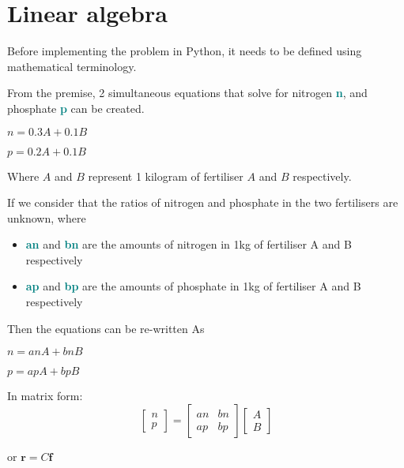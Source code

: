 \documentclass[a4paper]{article}
\begin{document}
\section{Linear algebra}
Before implementing the problem in Python, it needs to be defined using mathematical terminology.
\vspace{2mm}

\noindent
From the premise, 2 simultaneous equations that solve for nitrogen \textbf{\textcolor{teal}{n}}, and phosphate \textbf{\textcolor{teal}{p}} can be created.
\begin{center} $n=0.3A + 0.1B$ \end{center}
\begin{center} $p=0.2A + 0.1B$ \end{center}
\begin{center} Where $A$ and $B$ represent 1 kilogram of fertiliser $A$ and $B$ respectively. \end{center}

\noindent
If we consider that the ratios of nitrogen and phosphate in the two fertilisers are unknown, where
\begin{itemize}
    \item \textbf{\textcolor{teal}{an}} and \textbf{\textcolor{teal}{bn}} are the amounts of nitrogen in 1kg of fertiliser A and B respectively
    \item \textbf{\textcolor{teal}{ap}} and \textbf{\textcolor{teal}{bp}} are the amounts of phosphate in 1kg of fertiliser A and B respectively
\end{itemize}
Then the equations can be re-written As
\begin{center} $n=anA + bnB$ \end{center}
\begin{center} $p=apA + bpB$ \end{center}

\noindent
In matrix form:
\begin{equation*}
    \begin{bmatrix} n \\p \end{bmatrix} =
    \begin{bmatrix} an & bn \\ ap & bp \end{bmatrix}
    \begin{bmatrix} A \\B \end{bmatrix}
\end{equation*}
\begin{center} or $\mathbf{r} = C\mathbf{f}$ \end{center}
\end{document}
